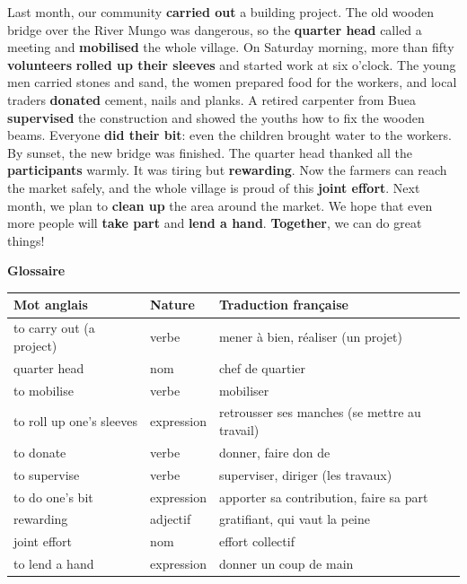 \documentclass[11pt]{article}
\begin{document}
\begin{textebox}
Last month, our community \textbf{carried out} a building project. The old wooden bridge over the River Mungo was dangerous, so the \textbf{quarter head} called a meeting and \textbf{mobilised} the whole village. On Saturday morning, more than fifty \textbf{volunteers} \textbf{rolled up their sleeves} and started work at six o'clock. The young men carried stones and sand, the women prepared food for the workers, and local traders \textbf{donated} cement, nails and planks. A retired carpenter from Buea \textbf{supervised} the construction and showed the youths how to fix the wooden beams. Everyone \textbf{did their bit}: even the children brought water to the workers. By sunset, the new bridge was finished. The quarter head thanked all the \textbf{participants} warmly. It was tiring but \textbf{rewarding}. Now the farmers can reach the market safely, and the whole village is proud of this \textbf{joint effort}. Next month, we plan to \textbf{clean up} the area around the market. We hope that even more people will \textbf{take part} and \textbf{lend a hand}. \textbf{Together}, we can do great things!
\end{textebox}

\textbf{Glossaire}

\begin{center}
\begin{tabularx}{\linewidth}{|l|l|X|}
\hline
\rowcolor{popblueL} Mot anglais & Nature & Traduction française \\
\hline
to carry out (a project) & verbe & mener à bien, réaliser (un projet) \\
\hline
quarter head & nom & chef de quartier \\
\hline
to mobilise & verbe & mobiliser \\
\hline
to roll up one's sleeves & expression & retrousser ses manches (se mettre au travail) \\
\hline
to donate & verbe & donner, faire don de \\
\hline
to supervise & verbe & superviser, diriger (les travaux) \\
\hline
to do one's bit & expression & apporter sa contribution, faire sa part \\
\hline
rewarding & adjectif & gratifiant, qui vaut la peine \\
\hline
joint effort & nom & effort collectif \\
\hline
to lend a hand & expression & donner un coup de main \\
\hline
\end{tabularx}
\end{center}
\end{document}
